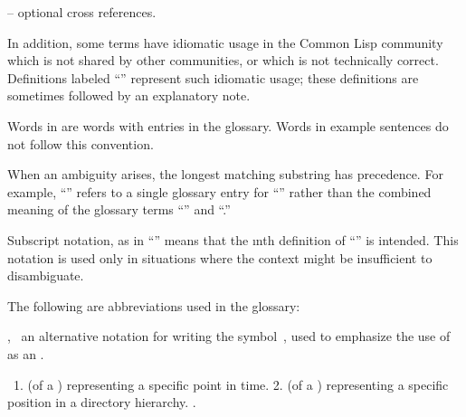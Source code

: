  \item{--} optional cross references.
 
\endlist
\endlist
 
In addition, some terms have idiomatic usage in the Common Lisp
community which is not shared by other communities, or which is not
technically correct.  Definitions labeled ``{\Idiomatic}'' represent
such idiomatic usage; these definitions are sometimes followed by an
explanatory note.
 
Words in  are words with entries in the glossary.
Words in example sentences do not follow this convention.
 
When an ambiguity arises, the longest matching substring has precedence.
For example, ``'' refers to a single glossary entry 
for ``'' rather than the combined meaning of the 
glossary terms ``'' and ``.''

Subscript notation, as in ``'' means that
the \i{n}th definition of ``'' is intended.  This
notation is used only in situations where the context might be insufficient
to disambiguate.

The following are abbreviations used in the glossary:
 
 
\beginlist


\gentry{()} , \Noun\
  an alternative notation for writing the symbol~\nil, used to emphasize
  the use of \term{nil} as an \term{empty list}.


 \Adjective\
  1. (of a )
     representing a specific point in time.
  2. (of a )
     representing a specific position in a directory hierarchy.
  \Seeterm{relative}.

